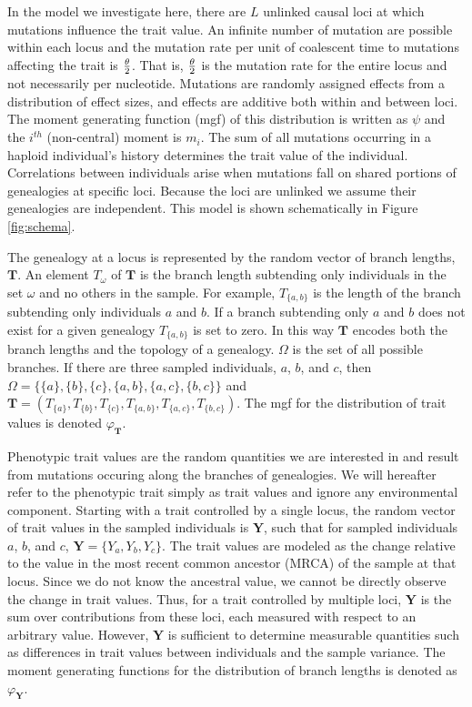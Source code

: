 In the model we investigate here, there are $L$ unlinked causal loci at which
mutations influence the trait value. An infinite number of mutation are possible
within each locus and the mutation rate per unit of coalescent time to mutations
affecting the trait is $\frac{\theta}{2}$. That is, $\frac{\theta}{2}$ is the mutation rate for the entire
locus and not necessarily per nucleotide. Mutations are randomly assigned
effects from a distribution of effect sizes, and effects are additive both
within and between loci. The moment generating function (mgf) of this
distribution is written as $\psi$ and the $i^{th}$ (non-central) moment is
$m_i$. The sum of all mutations occurring in a haploid individual's history
determines the trait value of the individual. Correlations between individuals
arise when mutations fall on shared portions of genealogies at specific loci.
Because the loci are unlinked we assume their genealogies are independent. This
model is shown schematically in Figure \ref{fig:schema}.

The genealogy at a locus is represented by the random vector of branch lengths,
$\mathbf{T}$. An element $T_{\omega}$ of $\mathbf{T}$ is the branch length
subtending only individuals in the set $\omega$ and no others in the sample. For
example, $T_{\{a,b\}}$ is the length of the branch subtending only individuals
$a$ and $b$. If a branch subtending only $a$ and $b$ does not exist for a given
genealogy $T_{\{a,b\}}$ is set to zero. In this way $\mathbf{T}$ encodes both
the branch lengths and the topology of a genealogy. $\Omega$ is the set of all
possible branches. If there are three sampled individuals, $a$, $b$, and $c$,
then $\Omega=\{\{a\},\{b\},\{c\},\{a,b\},\{a,c\},\{b,c\}\}$ and
$\mathbf{T}=(T_{\{a\}},T_{\{b\}},T_{\{c\}},T_{\{a,b\}},T_{\{a,c\}},T_{\{b,c\}})$.
The mgf for the distribution of trait values is denoted $\varphi_{\mathbf{T}}$.

Phenotypic trait values are the random quantities we are interested in and
result from mutations occuring along the branches of genealogies. We will
hereafter refer to the phenotypic trait simply as trait values and ignore any
environmental component. Starting with a trait controlled by a single locus, the
random vector of trait values in the sampled individuals is $\mathbf{Y}$, such
that for sampled individuals $a$, $b$, and $c$, $\mathbf{Y}=\{Y_a,Y_b,Y_c\}$.
The trait values are modeled as the change relative to the value in the most
recent common ancestor (MRCA) of the sample at that locus. Since we do not know
the ancestral value, we cannot be directly observe the change in trait values.
Thus, for a trait controlled by multiple loci, $\mathbf{Y}$ is the sum over
contributions from these loci, each measured with respect to an arbitrary value.
However, $\mathbf{Y}$ is sufficient to determine measurable quantities such as
differences in trait values between individuals and the sample variance. The
moment generating functions for the distribution of branch lengths is denoted as
$\varphi_{\mathbf{Y}}$.

